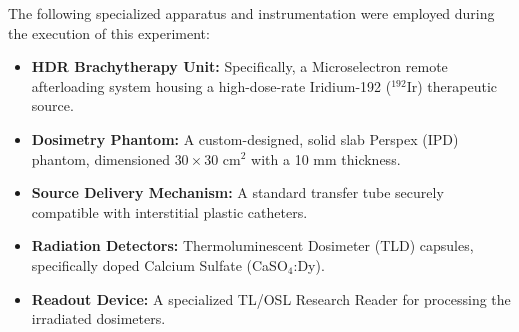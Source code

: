 The following specialized apparatus and instrumentation were employed during the execution of this experiment:
\begin{itemize}
    \item \textbf{HDR Brachytherapy Unit:} Specifically, a Microselectron remote afterloading system housing a high-dose-rate Iridium-192 ($^{192}$Ir) therapeutic source.
    \item \textbf{Dosimetry Phantom:} A custom-designed, solid slab Perspex (IPD) phantom, dimensioned $30 \times 30$ cm$^2$ with a 10 mm thickness.
    \item \textbf{Source Delivery Mechanism:} A standard transfer tube securely compatible with interstitial plastic catheters.
    \item \textbf{Radiation Detectors:} Thermoluminescent Dosimeter (TLD) capsules, specifically doped Calcium Sulfate (CaSO$_4$:Dy).
    \item \textbf{Readout Device:} A specialized TL/OSL Research Reader for processing the irradiated dosimeters.
\end{itemize}